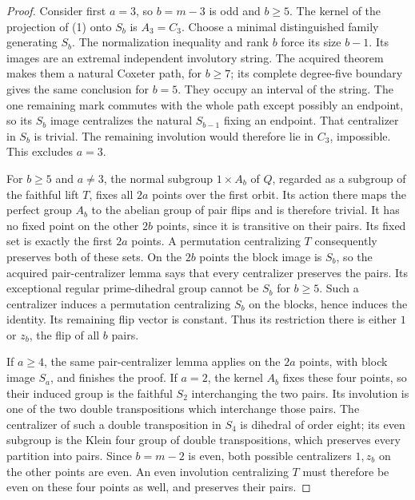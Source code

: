 \documentclass[11pt,a4paper]{article}
\begin{document}
\begin{proof}
Consider first $a=3$, so $b=m-3$ is odd and $b\ge5$.
The kernel of the projection of (1) onto $S_b$ is $A_3=C_3$.
Choose a minimal distinguished family generating $S_b$.
The normalization inequality and rank $b$ force its size
$b-1$. Its images are an extremal independent involutory
string. The acquired theorem makes them a natural Coxeter
path, for $b\ge7$; its complete degree-five boundary gives
the same conclusion for $b=5$. They occupy an interval of
the string. The one remaining mark commutes with the whole
path except possibly an endpoint, so its $S_b$ image
centralizes the natural $S_{b-1}$ fixing an endpoint.
That centralizer in $S_b$ is trivial. The remaining involution
would therefore lie in $C_3$, impossible. This excludes $a=3$.

For $b\ge5$ and $a\ne3$, the normal subgroup $1\times A_b$
of $Q$, regarded as a subgroup of the faithful lift $T$,
fixes all $2a$ points over the first orbit. Its action there
maps the perfect group $A_b$ to the abelian group of pair
flips and is therefore trivial. It has no fixed point on
the other $2b$ points, since it is transitive on their pairs.
Its fixed set is exactly the first $2a$ points. A permutation
centralizing $T$ consequently preserves both of these sets.
On the $2b$ points the block image is $S_b$, so the acquired
pair-centralizer lemma says that every centralizer preserves
the pairs. Its exceptional regular prime-dihedral group
cannot be $S_b$ for $b\ge5$. Such a centralizer induces a
permutation centralizing $S_b$ on the blocks, hence induces
the identity. Its remaining flip vector is constant. Thus
its restriction there is either $1$ or $z_b$, the flip of
all $b$ pairs.

If $a\ge4$, the same pair-centralizer lemma applies on the
$2a$ points, with block image $S_a$, and finishes the proof.
If $a=2$, the kernel $A_b$ fixes these four points, so their
induced group is the faithful $S_2$ interchanging the two
pairs. Its involution is one of the two double transpositions
which interchange those pairs. The centralizer of such a
double transposition in $S_4$ is dihedral of order eight;
its even subgroup is the Klein four group of double
transpositions, which preserves every partition into pairs.
Since $b=m-2$ is even, both possible centralizers $1,z_b$
on the other points are even. An even involution centralizing
$T$ must therefore be even on these four points as well,
and preserves their pairs.


\end{proof}
\end{document}
